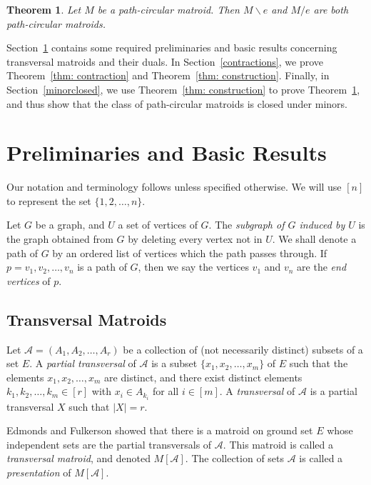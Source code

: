 \documentclass[11pt, reqno]{amsart}
\newtheorem{theorem}{Theorem} [section]
\begin{document}
\begin{theorem} \label{thm: minors}
Let $M$ be a path-circular matroid. Then $M \backslash e$ and $M / e$ are both path-circular matroids.
\end{theorem}

Section~\ref{prelims} contains some required preliminaries and basic results concerning transversal matroids and their duals. In Section~\ref{contractions}, we prove Theorem~\ref{thm: contraction} and Theorem~\ref{thm: construction}. Finally, in Section~\ref{minorclosed}, we use Theorem~\ref{thm: construction} to prove Theorem~\ref{thm: minors}, and thus show that the class of path-circular matroids is closed under minors.

\section{Preliminaries and Basic Results} \label{prelims}

Our notation and terminology follows \cite{oxley} unless specified otherwise. We will use $[n]$ to represent the set $\{1,2,\ldots,n\}$.

Let $G$ be a graph, and $U$ a set of vertices of $G$. The \emph{subgraph of $G$ induced by $U$} is the graph obtained from $G$ by deleting every vertex not in $U$. We shall denote a path of $G$ by an ordered list of vertices which the path passes through. If $p = v_1,v_2,\ldots,v_n$ is a path of $G$, then we say the vertices $v_1$ and $v_n$ are the \emph{end vertices} of $p$.

\subsection{Transversal Matroids}

Let $\mathcal A = (A_1, A_2, \ldots, A_r)$ be a collection of (not necessarily distinct) subsets of a set $E$. A \emph{partial transversal} of $\mathcal A$ is a subset $\{x_1, x_2, \ldots, x_m\}$ of $E$ such that the elements $x_1, x_2, \ldots, x_m$ are distinct, and there exist distinct elements $k_1, k_2, \ldots, k_m \in [r]$ with $x_i \in A_{k_i}$ for all $i \in [m]$. A \emph{transversal} of $\mathcal A$ is a partial transversal $X$ such that $|X| = r$.

Edmonds and Fulkerson \cite{edm65} showed that there is a matroid on ground set $E$ whose independent sets are the partial transversals of $\mathcal A$. This matroid is called a \emph{transversal matroid}, and denoted $M[\mathcal A]$. The collection of sets $\mathcal A$ is called a \emph{presentation} of $M[\mathcal A]$.
\end{document}
